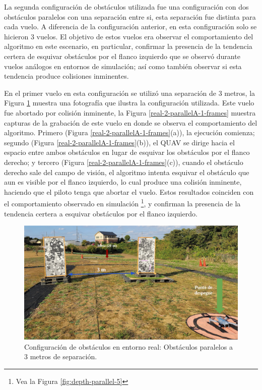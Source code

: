La segunda configuración de obstáculos utilizada fue una configuración con dos obstáculos paralelos con una separación entre si, esta separación fue distinta para cada vuelo. A diferencia de la configuración anterior, en esta configuración solo se hicieron 3 vuelos. El objetivo de estos vuelos era observar el comportamiento del algoritmo en este escenario, en particular, confirmar la presencia de la tendencia certera de esquivar obstáculos por el flanco izquierdo que se observó durante vuelos análogos en entornos de simulación; así como también observar si esta tendencia produce colisiones inminentes.

En el primer vuelo en esta configuración se utilizó una separación de 3 metros, la Figura \ref{real-2-parallelA-0-config} muestra una fotografía que ilustra la configuración utilizada. Este vuelo fue abortado por colisión inminente, la Figura \ref{real-2-parallelA-1-frames} muestra capturas de la grabación de este vuelo en donde se observa el comportamiento del algoritmo. Primero (Figura \ref{real-2-parallelA-1-frames}(a)), la ejecución comienza; segundo (Figura \ref{real-2-parallelA-1-frames}(b)), el QUAV se dirige hacia el espacio entre ambos obstáculos en lugar de esquivar los obstáculos por el flanco derecho; y tercero (Figura \ref{real-2-parallelA-1-frames}(c)), cuando el obstáculo derecho sale del campo de visión, el algoritmo intenta esquivar el obstáculo que aun es visible por el flanco izquierdo, lo cual produce una colisión inminente, haciendo que el piloto tenga que abortar el vuelo. Estos resultados coinciden con el comportamiento observado en simulación \footnote[1]{Vea la Figura \ref{fig:depth-parallel-5}}, y confirman la presencia de la tendencia certera a esquivar obstáculos por el flanco izquierdo.

\begin{figure}[H]
    \centering
    \includegraphics[scale=0.22]{partes/img/real-2-parallelA-0-config.png}
    \caption[Configuración de obstáculos en entorno real: Obstáculos paralelos a 3 metros de separación.]{Configuración de obstáculos en entorno real: Obstáculos paralelos a 3 metros de separación.}
    \label{real-2-parallelA-0-config}
\end{figure}

